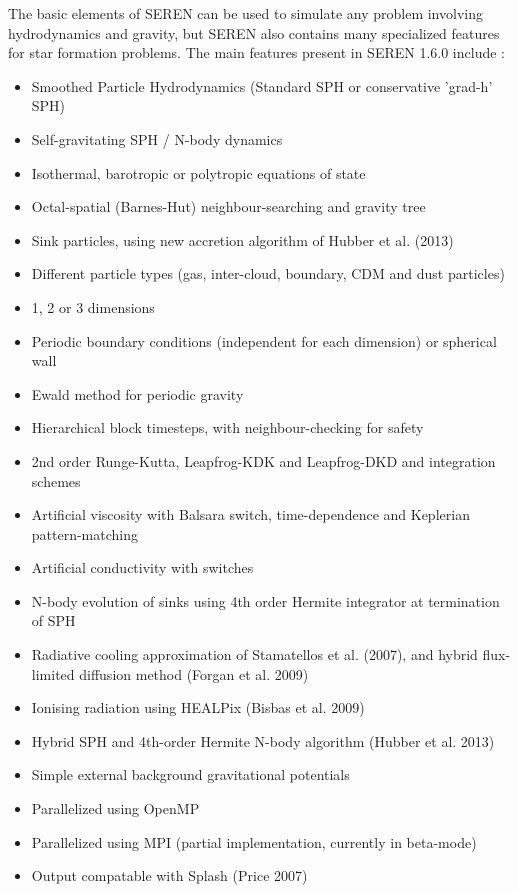 \documentclass[a4paper]{article}
\newcommand{\VERNO}{1.6.0 }
\begin{document}
The basic elements of SEREN can be used to simulate any problem involving hydrodynamics and gravity, but SEREN also contains many specialized features for star formation problems.  The main features present in SEREN \VERNO  include : 
\begin{itemize}
\item Smoothed Particle Hydrodynamics (Standard SPH or conservative 'grad-h' SPH)
\item Self-gravitating SPH / N-body dynamics
\item Isothermal, barotropic or polytropic equations of state
\item Octal-spatial (Barnes-Hut) neighbour-searching and gravity tree
\item Sink particles, using new accretion algorithm of Hubber et al. (2013)
\item Different particle types (gas, inter-cloud, boundary, CDM and dust particles)
\item 1, 2 or 3 dimensions
\item Periodic boundary conditions (independent for each dimension) or spherical wall
\item Ewald method for periodic gravity
\item Hierarchical block timesteps, with neighbour-checking for safety
\item 2nd order Runge-Kutta, Leapfrog-KDK and Leapfrog-DKD and integration schemes
\item Artificial viscosity with Balsara switch, time-dependence and Keplerian pattern-matching
\item Artificial conductivity with switches
\item N-body evolution of sinks using 4th order Hermite integrator at termination of SPH
\item Radiative cooling approximation of Stamatellos et al. (2007), and hybrid flux-limited diffusion method (Forgan et al. 2009)
\item Ionising radiation using HEALPix (Bisbas et al. 2009)
\item Hybrid SPH and 4th-order Hermite N-body algorithm (Hubber et al. 2013)
\item Simple external background gravitational potentials
\item Parallelized using OpenMP
\item Parallelized using MPI (partial implementation, currently in beta-mode)
\item Output compatable with Splash (Price 2007)
\end{itemize}
\end{document}
